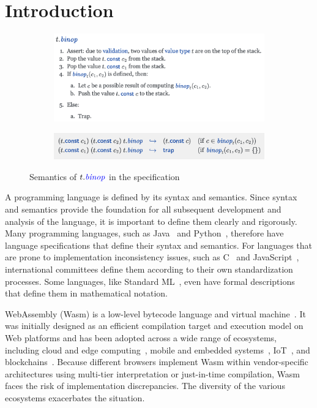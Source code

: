 \section{Introduction}\label{sec:intro}
\begin{figure}[t]
  \centering
  \begin{subfigure}{\textwidth}
    \centering
    \includegraphics[width=.7\textwidth]{../img/spec-prose.png}
\vspace*{-1em}
\vspace*{.5em}
  \end{subfigure}
  \begin{subfigure}{\textwidth}
    \centering
    \includegraphics[width=.7\textwidth]{../img/spec-formal.png}
  \end{subfigure}
\caption{Semantics of \ensuremath{t.\mathit{\inblue{binop}}} in the specification}
\label{fig:spec}
\end{figure}

A programming language is defined by its syntax and semantics.
Since syntax and semantics provide the foundation for all subsequent development and
analysis of the language, it is important to define them clearly and rigorously. 
Many programming languages, such as Java~\cite{javaspec} and Python~\cite{pythonspec},
therefore have language specifications that define their syntax and semantics.
For languages that are prone to implementation inconsistency issues,
such as C~\cite{cstandard} and JavaScript~\cite{ecmascript},
international committees define them according to their own standardization processes.
Some languages, like Standard ML~\cite{sml}, even have formal descriptions
that define them in mathematical notation.

WebAssembly (Wasm) is a low-level bytecode language and virtual machine~\cite{wasmspec}.
It was initially designed as an efficient compilation target and execution model on Web platforms
and has been adopted across a wide range of ecosystems,
including cloud and edge computing~\cite{lucet, cloudflare}, 
mobile and embedded systems~\cite{wasm-embedded}, IoT~\cite{wasm-iot}, and
blockchains~\cite{wasm-blockchain}.
Because different browsers implement Wasm within vendor-specific architectures
using multi-tier interpretation or just-in-time compilation,
Wasm faces the risk of implementation discrepancies.
The diversity of the various ecosystems exacerbates the situation.

